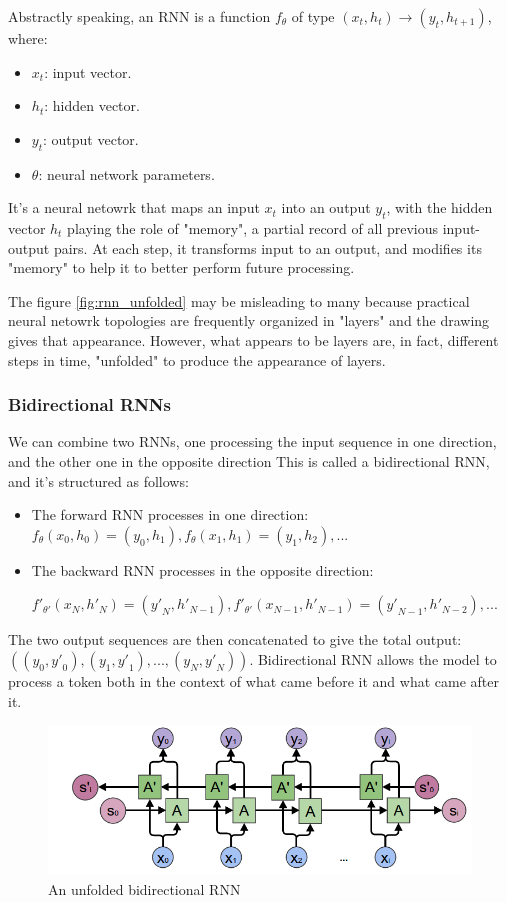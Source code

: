 \documentclass{article}
\begin{document}
Abstractly speaking, an RNN is a function $f_{\theta}$ of type $(x_t, h_t) \rightarrow (y_t, h_{t+1})$, where:
\begin{itemize}
  \item $x_t$: input vector.
  \item $h_t$: hidden vector.
  \item $y_t$: output vector.
  \item $\theta$: neural network parameters.
\end{itemize}

It's a neural netowrk that maps an input $x_t$ into an output $y_t$, with the hidden vector $h_t$ playing the role of "memory", a partial record of all previous input-output pairs.
At each step, it transforms input to an output, and modifies its "memory" to help it to better perform future processing.

The figure \ref{fig:rnn_unfolded} may be misleading to many because practical neural netowrk topologies are frequently organized in "layers" and the drawing gives that appearance.
However, what appears to be layers are, in fact, different steps in time, "unfolded" to produce the appearance of layers.

\subsubsection{Bidirectional RNNs}

We can combine two RNNs, one processing the input sequence in one direction, and the other one in the opposite direction
This is called a bidirectional RNN, and it's structured as follows:
\begin{itemize}
  \item The forward RNN processes in one direction: $f_{\theta}(x_0, h_0) = (y_0, h_1), f_{\theta}(x_1, h_1) = (y_1, h_2), ...$
  \item The backward RNN processes in the opposite direction:
  
  ${f'}_{\theta '}(x_N, {h'}_N) = ({y'}_N, {h'}_{N-1}), {f'}_{\theta '}(x_{N-1}, {h'}_{N-1}) = ({y'}_{N-1},{h'}_{N-2}), ...$
\end{itemize}

The two output sequences are then concatenated to give the total output: $((y_0, {y'}_0), (y_1, {y'}_1), ..., (y_N, {y'}_N))$.
Bidirectional RNN allows the model to process a token both in the context of what came before it and what came after it.

\begin{figure}[htbp]
  \centering
  \includegraphics[width=0.8\linewidth]{img/rnn_bidirectional.png}
  \caption{An unfolded bidirectional RNN}
  \label{fig:rnn_bidirectional}
\end{figure}
\end{document}
